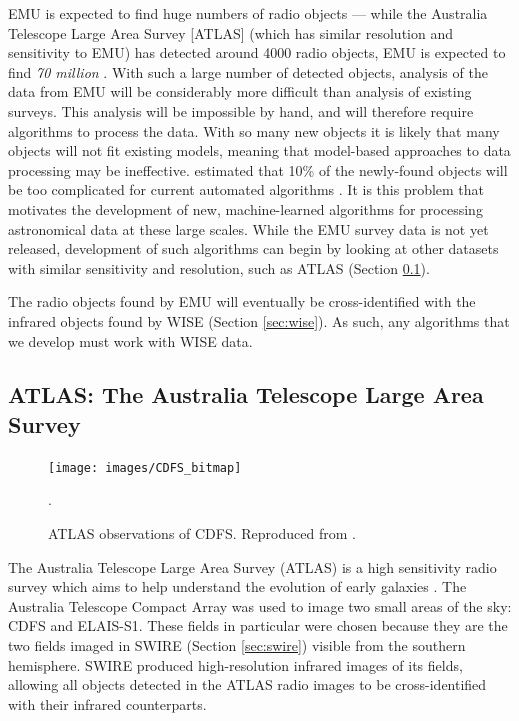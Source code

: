             EMU is expected to find huge numbers of radio objects --- while the
            Australia Telescope Large Area Survey [ATLAS] (which has similar
            resolution and sensitivity to EMU) has detected around 4000 radio
            objects, EMU is expected to find \emph{70 million}
            \citep{banfield15}. With such a large number of detected objects,
            analysis of the data from EMU will be considerably more difficult
            than analysis of existing surveys. This analysis will be impossible
            by hand, and will therefore require algorithms to process the data.
            With so many new objects it is likely that many objects will not fit
            existing models, meaning that model-based approaches to data
            processing may be ineffective. \citet{norris11} estimated that 10\%
            of the newly-found objects will be too complicated for current
            automated algorithms \citep{banfield15}. It is this problem that
            motivates the development of new, machine-learned algorithms for
            processing astronomical data at these large scales. While the EMU
            survey data is not yet released, development of such algorithms can
            begin by looking at other datasets with similar sensitivity and
            resolution, such as ATLAS (Section \ref{sec:atlas}).

            The radio objects found by EMU will eventually be cross-identified
            with the infrared objects found by WISE (Section \ref{sec:wise}). As
            such, any algorithms that we develop must work with WISE data.

        \subsection{ATLAS: The Australia Telescope Large Area Survey}
        \label{sec:atlas}

            \begin{figure}
                \centering
                \texttt{[image: images/CDFS\_bitmap]}
                \caption{ATLAS observations of CDFS.
                    Reproduced from \citet{franzen15}.}.
                \label{fig:cdfs}
            \end{figure}

            The Australia Telescope Large Area Survey (ATLAS) is a high
            sensitivity radio survey which aims to help understand the evolution
            of early galaxies \citep{norris06}. The Australia Telescope Compact
            Array was used to image two small areas of the sky: CDFS and
            ELAIS-S1. These fields in particular were chosen because they are
            the two fields imaged in SWIRE (Section \ref{sec:swire}) visible from
            the southern hemisphere. SWIRE produced high-resolution infrared
            images of its fields, allowing all objects detected in the ATLAS
            radio images to be cross-identified with their infrared
            counterparts.

